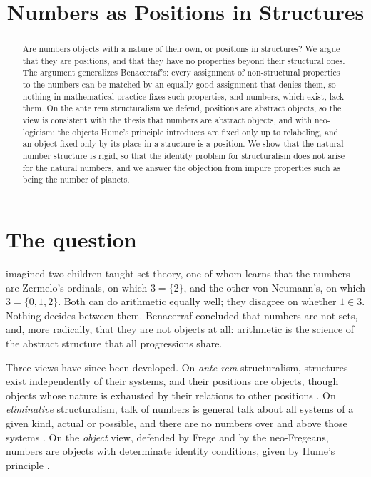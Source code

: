 \documentclass{situationist-preprint}
\title{Numbers as Positions in Structures}
\begin{document}
\maketitle

\begin{abstract}
Are numbers objects with a nature of their own, or positions in structures? We argue that they are positions, and that they have no properties beyond their structural ones. The argument generalizes Benacerraf's: every assignment of non-structural properties to the numbers can be matched by an equally good assignment that denies them, so nothing in mathematical practice fixes such properties, and numbers, which exist, lack them. On the ante rem structuralism we defend, positions are abstract objects, so the view is consistent with the thesis that numbers are abstract objects, and with neo-logicism: the objects Hume's principle introduces are fixed only up to relabeling, and an object fixed only by its place in a structure is a position. We show that the natural number structure is rigid, so that the identity problem for structuralism does not arise for the natural numbers, and we answer the objection from impure properties such as being the number of planets.
\end{abstract}

\section{The question}

\citet{Benacerraf1965} imagined two children taught set theory, one of whom learns that the numbers are Zermelo's ordinals, on which $3 = \{2\}$, and the other von Neumann's, on which $3 = \{0, 1, 2\}$. Both can do arithmetic equally well; they disagree on whether $1 \in 3$. Nothing decides between them. Benacerraf concluded that numbers are not sets, and, more radically, that they are not objects at all: arithmetic is the science of the abstract structure that all progressions share.

Three views have since been developed. On \emph{ante rem} structuralism, structures exist independently of their systems, and their positions are objects, though objects whose nature is exhausted by their relations to other positions \citep{Shapiro1997,Resnik1997}. On \emph{eliminative} structuralism, talk of numbers is general talk about all systems of a given kind, actual or possible, and there are no numbers over and above those systems \citep{Hellman1989}. On the \emph{object} view, defended by Frege and by the neo-Fregeans, numbers are objects with determinate identity conditions, given by Hume's principle \citep{Frege1884,HaleWright2001}.
\end{document}
